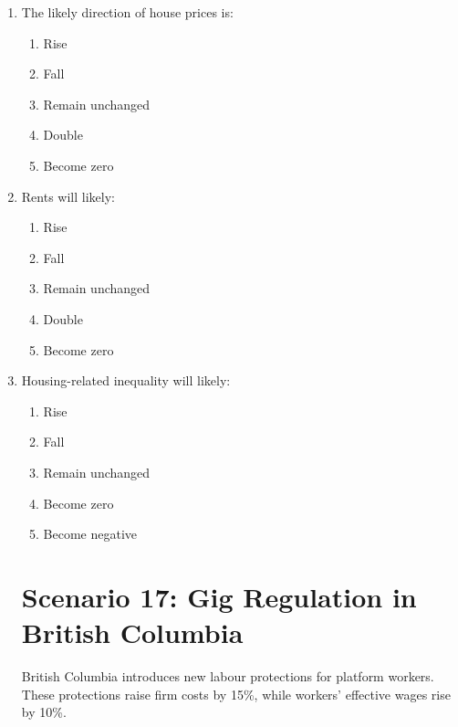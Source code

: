 \documentclass[12pt]{article}
\begin{document}
\begin{enumerate}[label=\textbf{\arabic*.}]
\section*{Scenario 16: Zoning Reform in Toronto}

Toronto reforms zoning rules to allow more high-density housing near transit stations. As a result, housing supply increases by 20\% while demand remains approximately fixed.

\item The likely direction of house prices is:
\begin{enumerate}[label=\Alph*.]
\item Rise
\item Fall
\item Remain unchanged
\item Double
\item Become zero
\end{enumerate}

\item Rents will likely:
\begin{enumerate}[label=\Alph*.]
\item Rise
\item Fall
\item Remain unchanged
\item Double
\item Become zero
\end{enumerate}

\item Housing-related inequality will likely:
\begin{enumerate}[label=\Alph*.]
\item Rise
\item Fall
\item Remain unchanged
\item Become zero
\item Become negative
\end{enumerate}

\section*{Scenario 17: Gig Regulation in British Columbia}

British Columbia introduces new labour protections for platform workers. These protections raise firm costs by 15\%, while workers' effective wages rise by 10\%.


\end{enumerate}
\end{document}
